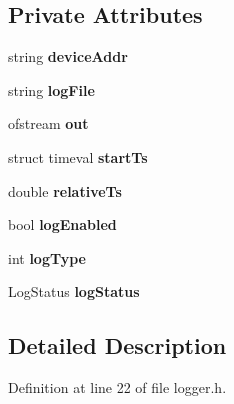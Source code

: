 \subsection*{\-Private \-Attributes}
\begin{DoxyCompactItemize}
\item 
\hypertarget{class_logger_a73099a7a544561b915ce5d2ded948f21}{string {\bfseries device\-Addr}}\label{class_logger_a73099a7a544561b915ce5d2ded948f21}

\item 
\hypertarget{class_logger_a8b200289dbdecb5185f2ac0bb4c1b99e}{string {\bfseries log\-File}}\label{class_logger_a8b200289dbdecb5185f2ac0bb4c1b99e}

\item 
\hypertarget{class_logger_ae902fa4a195223c0b746972ee46ca9aa}{ofstream {\bfseries out}}\label{class_logger_ae902fa4a195223c0b746972ee46ca9aa}

\item 
\hypertarget{class_logger_a28e321ba8244aa0f18433f8088502512}{struct timeval {\bfseries start\-Ts}}\label{class_logger_a28e321ba8244aa0f18433f8088502512}

\item 
\hypertarget{class_logger_ae8f07f0a62335b17156f72e0345adf82}{double {\bfseries relative\-Ts}}\label{class_logger_ae8f07f0a62335b17156f72e0345adf82}

\item 
\hypertarget{class_logger_a9fa4816586d6587deeebb2a090122273}{bool {\bfseries log\-Enabled}}\label{class_logger_a9fa4816586d6587deeebb2a090122273}

\item 
\hypertarget{class_logger_a1f167002b52baf4d1fdd4c996524ee84}{int {\bfseries log\-Type}}\label{class_logger_a1f167002b52baf4d1fdd4c996524ee84}

\item 
\hypertarget{class_logger_a7d49d3a9adc13ffb45bce2251a1afe53}{\-Log\-Status {\bfseries log\-Status}}\label{class_logger_a7d49d3a9adc13ffb45bce2251a1afe53}

\end{DoxyCompactItemize}


\subsection{\-Detailed \-Description}


\-Definition at line 22 of file logger.\-h.



